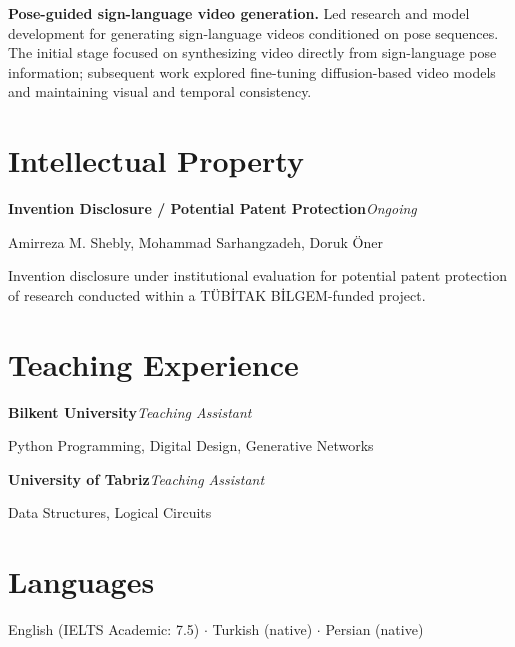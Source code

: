 \documentclass[10pt,a4paper]{article}
\newcommand{\workitem}[2]{%
  \Needspace{4\baselineskip}%
  \textbf{#1} #2\par\vspace{12pt}%
}
\begin{document}
\workitem
  {Pose-guided sign-language video generation.}
  {Led research and model development for generating sign-language videos conditioned on pose sequences. The initial stage focused on synthesizing video directly from sign-language pose information; subsequent work explored fine-tuning diffusion-based video models and maintaining visual and temporal consistency.}

\section*{Intellectual Property}
\textbf{Invention Disclosure / Potential Patent Protection}\hfill\textit{Ongoing}\par\vspace{3pt}
Amirreza M. Shebly, Mohammad Sarhangzadeh, Doruk \"Oner\par\vspace{3pt}
Invention disclosure under institutional evaluation for potential patent protection of research conducted within a T\"UB\.{I}TAK B\.{I}LGEM-funded project.\par

\section*{Teaching Experience}
\textbf{Bilkent University}\hfill\textit{Teaching Assistant}\par\vspace{3pt}
Python Programming, Digital Design, Generative Networks\par\vspace{10pt}
\textbf{University of Tabriz}\hfill\textit{Teaching Assistant}\par\vspace{3pt}
Data Structures, Logical Circuits\par

\section*{Languages}
English (IELTS Academic: 7.5) \quad $\cdot$ \quad Turkish (native) \quad $\cdot$ \quad Persian (native)
\end{document}
